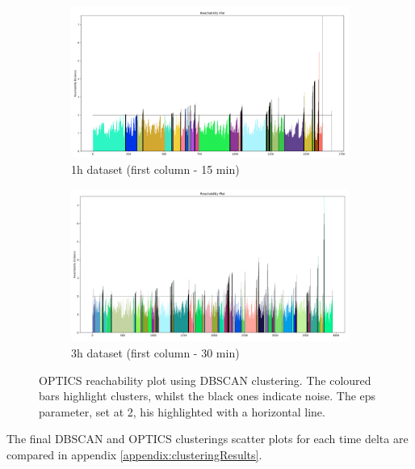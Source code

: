 \begin{figure}[H]
  \centering
  \begin{subfigure}{.5\textwidth}\captionsetup{width=.8\linewidth}
    \centering
    \includegraphics[width=1\textwidth]{./images/OPTICS/1h-1-reachabilityPlot-DBSCAN.png}
  \caption{1h dataset (first column - 15 min)}
  \end{subfigure}%
  \hfill
  \begin{subfigure}{.5\textwidth}\captionsetup{width=.8\linewidth}
    \centering
    \includegraphics[width=1\textwidth]{./images/OPTICS/3h-1-reachabilityPlot-DBSCAN.png}
    \caption{3h dataset (first column - 30 min)}
  \end{subfigure}
  \caption{OPTICS reachability plot using DBSCAN clustering. The coloured bars highlight clusters, whilst the black ones indicate noise. The eps parameter, set at 2, his highlighted with a horizontal line.}
  \label{figure:OPTICSResultsReachabilityPlot}
  \end{figure}


The final DBSCAN and OPTICS clusterings scatter plots for each time delta are compared in appendix \ref{appendix:clusteringResults}.
